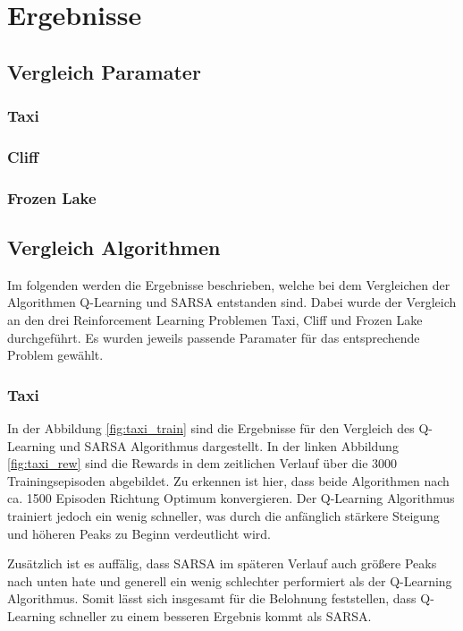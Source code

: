\section{Ergebnisse}

\subsection{Vergleich Paramater}
\subsubsection{Taxi}

\subsubsection{Cliff}

\subsubsection{Frozen Lake}

\subsection{Vergleich Algorithmen}

Im folgenden werden die Ergebnisse beschrieben, welche bei dem Vergleichen der Algorithmen Q-Learning und SARSA entstanden sind.
Dabei wurde der Vergleich an den drei Reinforcement Learning Problemen Taxi, Cliff und Frozen Lake durchgeführt. Es wurden jeweils passende Paramater für das entsprechende Problem gewählt.
\subsubsection{Taxi}

In der Abbildung \ref{fig:taxi_train} sind die Ergebnisse für den Vergleich des Q-Learning und SARSA Algorithmus dargestellt. In der linken Abbildung \ref{fig:taxi_rew} sind die Rewards in dem zeitlichen Verlauf über die 3000 Trainingsepisoden abgebildet. Zu erkennen ist hier, dass beide Algorithmen nach ca. 1500 Episoden Richtung Optimum konvergieren. Der Q-Learning Algorithmus trainiert jedoch ein wenig schneller, was durch die anfänglich stärkere Steigung und höheren Peaks zu Beginn verdeutlicht wird.

Zusätzlich ist es auffälig, dass SARSA im späteren Verlauf auch größere Peaks nach unten hate und generell ein wenig schlechter performiert als der Q-Learning Algorithmus. Somit lässt sich insgesamt für die Belohnung feststellen, dass Q-Learning schneller zu einem besseren Ergebnis kommt als SARSA. 

